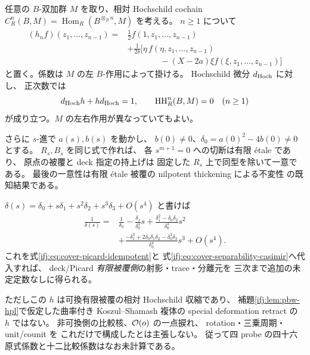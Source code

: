 \begin{corollary}
\label{ifj:cor:cover-hochschild-contraction}
任意の $B$-双加群 $M$ を取り、相対 Hochschild cochain
$C_R^n(B,M)=\operatorname{Hom}_R(B^{\otimes_R n},M)$ を考える。
$n\ge1$ について
\begin{equation}\label{ifj:eq:cover-hochschild-homotopy}
 \begin{split}
 (h_nf)(z_1,\ldots,z_{n-1})
   ={}&\frac12f(1,z_1,\ldots,z_{n-1})\\
     &+\frac1{2\delta}\bigl[
       \eta\,f(\eta,z_1,\ldots,z_{n-1})\\
     &\hspace{47pt}-(X-2a)\xi
                 f(\xi,z_1,\ldots,z_{n-1})\bigr]
 \end{split}
\end{equation}
と置く。係数は $M$ の左 $B$-作用によって掛ける。
Hochschild 微分 $d_{\rm Hoch}$ に対し、
正次数では
\[
 d_{\rm Hoch}h+hd_{\rm Hoch}=1,\qquad
 \operatorname{HH}_R^n(B,M)=0\quad(n\ge1)
\]
が成り立つ。$M$ の左右作用が異なっていてもよい。

さらに $s$-進で $a(s),b(s)$ を動かし、
$b(0)\ne0$、$\delta_0=a(0)^2-4b(0)\ne0$ とする。
$R_s,B_s$ を同じ式で作れば、
各 $s^{m+1}=0$ への切断は有限 \'{e}tale であり、
原点の被覆と deck 指定の持上げは
固定した $R_s$ 上で同型を除いて一意である。
最後の一意性は有限 \'{e}tale 被覆の
nilpotent thickening による不変性
\cite{IFJStacksFiniteEtaleThickening}の既知結果である。

$\delta(s)=\delta_0+s\delta_1+s^2\delta_2+s^3\delta_3+O(s^4)$
と書けば
\begin{equation}\label{ifj:eq:cover-cubic-separability-jets}
 \begin{split}
 \frac1{\delta(s)}
  ={}&\frac1{\delta_0}
   -\frac{\delta_1}{\delta_0^2}s
   +\frac{\delta_1^2-\delta_0\delta_2}{\delta_0^3}s^2\\
   &+\frac{-\delta_1^3+2\delta_0\delta_1\delta_2
                -\delta_0^2\delta_3}{\delta_0^4}s^3
     +O(s^4).
 \end{split}
\end{equation}
これを式\eqref{ifj:eq:cover-picard-idempotent}と
式\eqref{ifj:eq:cover-separability-casimir}へ代入すれば、
deck/Picard \emph{有限被覆側}の射影・trace・分離元を
三次まで追加の未定定数なしに得られる。

ただしこの $h$ は可換有限被覆の相対 Hochschild 収縮であり、
補題\ref{ifj:lem:pbw-hpl}で仮定した曲率付き
Koszul--Shamash 複体の special deformation retract の
$h$ ではない。
非可換側の比較核、$\mathcal O(o)$ の一点捩れ、
rotation・三乗周期・unit/counit を
これだけで構成したとは主張しない。
従って四 probe の四十六原式係数と十二比較係数はなお未計算である。
\end{corollary}

